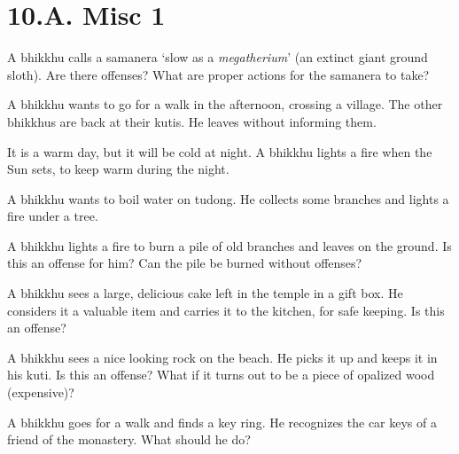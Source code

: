 \chapter{10.A. Misc 1}
\renewcommand*{\theChapterTitle}{10.A. Misc 1}

A bhikkhu calls a samanera `slow as a \emph{megatherium}' (an extinct giant ground sloth).
Are there offenses?
What are proper actions for the samanera to take?

\bigskip

A bhikkhu wants to go for a walk in the afternoon, crossing a village. The other bhikkhus are back at their kutis.
He leaves without informing them.

\bigskip

It is a warm day, but it will be cold at night. A bhikkhu lights a fire when the Sun sets, to keep warm during the night.

\bigskip

A bhikkhu wants to boil water on tudong. He collects some branches and lights a fire under a tree.

\bigskip

A bhikkhu lights a fire to burn a pile of old branches and leaves on the ground.
Is this an offense for him?
Can the pile be burned without offenses?

\bigskip

A bhikkhu sees a large, delicious cake left in the temple in a gift box.
He considers it a valuable item and carries it to the kitchen, for safe keeping.
Is this an offense?

\bigskip

A bhikkhu sees a nice looking rock on the beach.
He picks it up and keeps it in his kuti.
Is this an offense?
What if it turns out to be a piece of opalized wood (expensive)?

\bigskip

A bhikkhu goes for a walk and finds a key ring.
He recognizes the car keys of a friend of the monastery.
What should he do?
